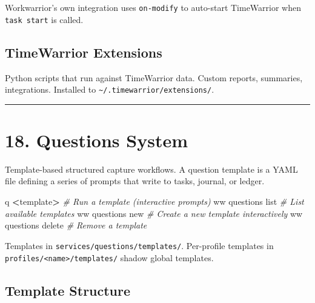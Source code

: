 \documentclass[
]{article}
\newenvironment{Shaded}{\begin{snugshade}}{\end{snugshade}}
\newcommand{\CommentTok}[1]{\textcolor[rgb]{0.56,0.35,0.01}{\textit{#1}}}
\newcommand{\ExtensionTok}[1]{#1}
\newcommand{\NormalTok}[1]{#1}
\newcommand{\OperatorTok}[1]{\textcolor[rgb]{0.81,0.36,0.00}{\textbf{#1}}}
\begin{document}
Workwarrior's own integration uses \texttt{on-modify} to auto-start
TimeWarrior when \texttt{task\ start} is called.

\subsection{TimeWarrior Extensions}\label{timewarrior-extensions}

Python scripts that run against TimeWarrior data. Custom reports,
summaries, integrations. Installed to
\texttt{\textasciitilde{}/.timewarrior/extensions/}.

\begin{center}\rule{0.5\linewidth}{0.5pt}\end{center}

\section{18. Questions System}\label{questions-system}

Template-based structured capture workflows. A question template is a
YAML file defining a series of prompts that write to tasks, journal, or
ledger.

\begin{Shaded}
\begin{Highlighting}[]
\ExtensionTok{q} \OperatorTok{\textless{}}\NormalTok{template}\OperatorTok{\textgreater{}}            \CommentTok{\# Run a template (interactive prompts)}
\ExtensionTok{ww}\NormalTok{ questions list       }\CommentTok{\# List available templates}
\ExtensionTok{ww}\NormalTok{ questions new        }\CommentTok{\# Create a new template interactively}
\ExtensionTok{ww}\NormalTok{ questions delete     }\CommentTok{\# Remove a template}
\end{Highlighting}
\end{Shaded}

Templates in \texttt{services/questions/templates/}. Per-profile
templates in \texttt{profiles/\textless{}name\textgreater{}/templates/}
shadow global templates.

\subsection{Template Structure}\label{template-structure}
\end{document}
